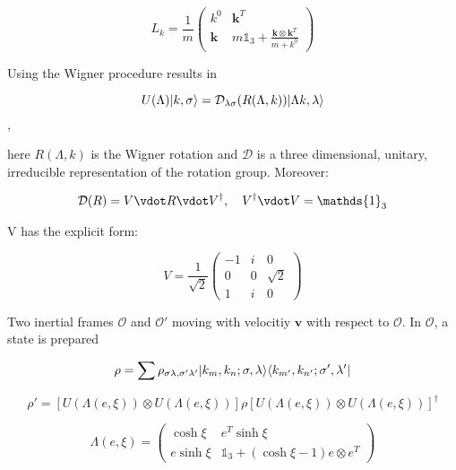 \begin{equation}
    L_k = \frac{1}{m}\begin{pmatrix}
        k^0 & \textbf{k}^T \\
        \textbf{k} & m \mathds{1}_3+\frac{\textbf{k}\otimes \textbf{k}^T}{m+k^0} 
        \end{pmatrix}
\end{equation}

Using the Wigner procedure results in

\begin{equation}
    U(\Lambda)\lvert k,\sigma\rangle = \mathcal{D}_{\lambda\sigma}(R(\Lambda,k))\lvert\Lambda k,\lambda\rangle
\end{equation},

here $R(\Lambda,k)$ is the Wigner rotation and $\mathcal{D}$ is a three dimensional, unitary, irreducible representation of the rotation group.
Moreover:

\begin{equation}
    \mathcal{D}(R) = V \vdot R \vdot V^\dagger, \quad V^\dagger\vdot V = \mathds{1}_3
\end{equation}

V has the explicit form:

\begin{equation}
    V = \frac{1}{\sqrt{2}}\begin{pmatrix}
        -1 & i & 0 \\
        0 & 0 & \sqrt{2} \\
        1 & i & 0 
        \end{pmatrix}
\end{equation}

Two inertial frames $\mathcal{O}$ and $\mathcal{O'}$ moving with velocitiy $\textbf{v}$ with respect to $\mathcal{O}$. In $\mathcal{O}$, a state is prepared

\begin{equation}
    \rho = \sum \rho_{\sigma \lambda, \sigma' \lambda'} \lvert k_m, k_n ; \sigma, \lambda\rangle \langle k_{m'}, k_{n'} ; \sigma', \lambda'\rvert
\end{equation}

\begin{equation}
    \rho' = \left[ U(\Lambda(e, \xi)) \otimes U(\Lambda(e, \xi)) \right] \rho \left[ U(\Lambda(e, \xi)) \otimes U(\Lambda(e, \xi)) \right]^\dagger
\end{equation}

\begin{equation}
    \Lambda(e, \xi) =
    \begin{pmatrix}
        \cosh \xi & e^T \sinh \xi \\
        e \sinh \xi & \mathds{1}_3 + (\cosh \xi - 1) e \otimes e^T
    \end{pmatrix}
\end{equation}

